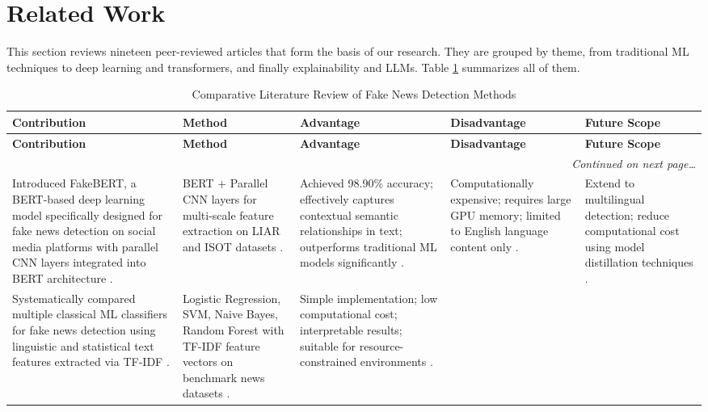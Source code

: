 \documentclass[runningheads]{llncs}
\begin{document}
\section{Related Work}

This section reviews nineteen peer-reviewed articles that form the basis of our research. They are grouped by theme, from traditional ML techniques to deep learning and transformers, and finally explainability and LLMs. Table \ref{tab:litreview} summarizes all of them.

\begin{longtable}{|p{}|p{}|p{}|p{}|p{}|}
\caption{Comparative Literature Review of Fake News Detection Methods} \label{tab:litreview} \\
\hline
\textbf{Contribution} & \textbf{Method} & \textbf{Advantage} & \textbf{Disadvantage} & \textbf{Future Scope} \\ \hline
\endfirsthead
\hline
\textbf{Contribution} & \textbf{Method} & \textbf{Advantage} & \textbf{Disadvantage} & \textbf{Future Scope} \\ \hline
\endhead
\hline
\multicolumn{5}{r}{\small\textit{Continued on next page\ldots}} \\
\endfoot
\hline
\endlastfoot
Introduced FakeBERT, a BERT-based deep learning model specifically designed for fake news detection on social media platforms with parallel CNN layers integrated into BERT architecture \cite{Kaliyar2021FakeBERT}. &
BERT + Parallel CNN layers for multi-scale feature extraction on LIAR and ISOT datasets \cite{Kaliyar2021FakeBERT}. &
Achieved 98.90\% accuracy; effectively captures contextual semantic relationships in text; outperforms traditional ML models significantly \cite{Kaliyar2021FakeBERT}. &
Computationally expensive; requires large GPU memory; limited to English language content only \cite{Kaliyar2021FakeBERT}. &
Extend to multilingual detection; reduce computational cost using model distillation techniques \cite{Kaliyar2021FakeBERT}. \\ \hline
Systematically compared multiple classical ML classifiers for fake news detection using linguistic and statistical text features extracted via TF-IDF \cite{Aphiwongsophon2021Detecting}. &
Logistic Regression, SVM, Naive Bayes, Random Forest with TF-IDF feature vectors on benchmark news datasets \cite{Aphiwongsophon2021Detecting}. &
Simple implementation; low computational cost; interpretable results; suitable for resource-constrained environments \cite{Aphiwongsophon2021Detecting}. &

\end{longtable}
\end{document}
